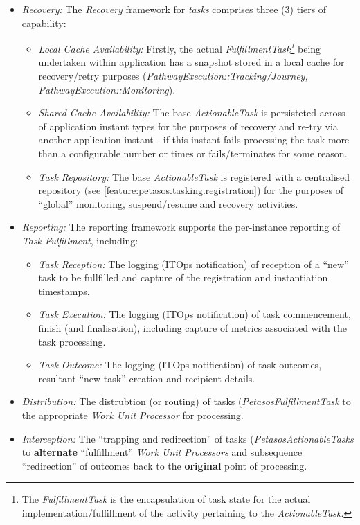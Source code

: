 \documentclass[a4paper]{book}
\begin{document}
\begin{itemize}
\begin{itemize}
            \item \textit{Recovery:} The \textit{Recovery} framework for \textit{tasks} comprises three (3) tiers of capability:
            \begin{itemize}
                \item \textit{Local Cache Availability:} Firstly, the actual \textit{FulfillmentTask\footnote{The \textit{FulfillmentTask} is the encapsulation of task state for the actual implementation/fulfillment of the activity pertaining to the \textit{ActionableTask}.}} being undertaken within application has a snapshot stored in a local cache for recovery/retry purposes (\textit{PathwayExecution::Tracking/Journey, PathwayExecution::Monitoring}).
                \item \textit{Shared Cache Availability:} The base \textit{ActionableTask} is persisteted across of application instant types for the purposes of recovery and re-try via another application instant - if this instant fails processing the task more than a configurable number or times or fails/terminates for some reason.
                \item \textit{Task Repository:} The base \textit{ActionableTask} is registered  with a centralised repository (see \ref{feature:petasos.tasking.registration}) for the purposes of ``global'' monitoring, suspend/resume and recovery activities.
            \end{itemize}
            \item \textit{Reporting:} The reporting framework supports the per-instance reporting of \textit{Task Fulfillment}, including:
            \begin{itemize}
                \item \textit{Task Reception:} The logging (ITOps notification) of reception of a ``new'' task to be fullfilled and capture of the registration and instantiation timestamps.
                \item \textit{Task Execution:} The logging (ITOps notification) of task commencement, finish (and finalisation), including capture of metrics associated with the task processing.
                \item \textit{Task Outcome:} The logging (ITOps notification) of task outcomes, resultant ``new task'' creation and recipient details.
            \end{itemize}
            \item \textit{Distribution:} The distrubtion (or routing) of tasks (\textit{PetasosFulfillmentTask} to the appropriate \textit{Work Unit Processor} for processing.
            \item \textit{Interception:} The ``trapping and redirection'' of tasks (\textit{PetasosActionableTasks} to \textbf{alternate} ``fulfillment'' \textit{Work Unit Processors} and subsequence ``redirection'' of outcomes back to the \textbf{original} point of processing.
        \end{itemize}
    \end{itemize}
\end{document}
